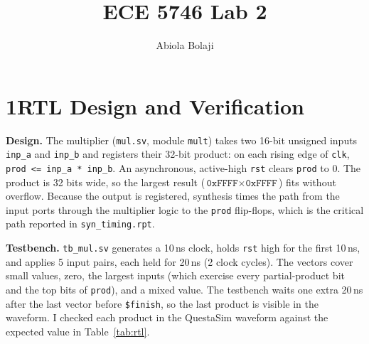 \documentclass[11pt]{article}
\title{ECE 5746 Lab 2}
\author{Abiola Bolaji}
\date{}
\begin{document}
\maketitle

\section*{1\quad RTL Design and Verification}

\textbf{Design.} The multiplier (\texttt{mul.sv}, module \texttt{mult}) takes two 16-bit unsigned inputs \texttt{inp\_a} and \texttt{inp\_b} and registers their 32-bit product: on each rising edge of \texttt{clk}, \texttt{prod <= inp\_a * inp\_b}. An asynchronous, active-high \texttt{rst} clears \texttt{prod} to 0. The product is 32 bits wide, so the largest result ($\texttt{0xFFFF} \times \texttt{0xFFFF}$) fits without overflow. Because the output is registered, synthesis times the path from the input ports through the multiplier logic to the \texttt{prod} flip-flops, which is the critical path reported in \texttt{syn\_timing.rpt}.

\textbf{Testbench.} \texttt{tb\_mul.sv} generates a 10\,ns clock, holds \texttt{rst} high for the first 10\,ns, and applies 5 input pairs, each held for 20\,ns (2 clock cycles). The vectors cover small values, zero, the largest inputs (which exercise every partial-product bit and the top bits of \texttt{prod}), and a mixed value. The testbench waits one extra 20\,ns after the last vector before \texttt{\$finish}, so the last product is visible in the waveform. I checked each product in the QuestaSim waveform against the expected value in Table~\ref{tab:rtl}.
\end{document}
